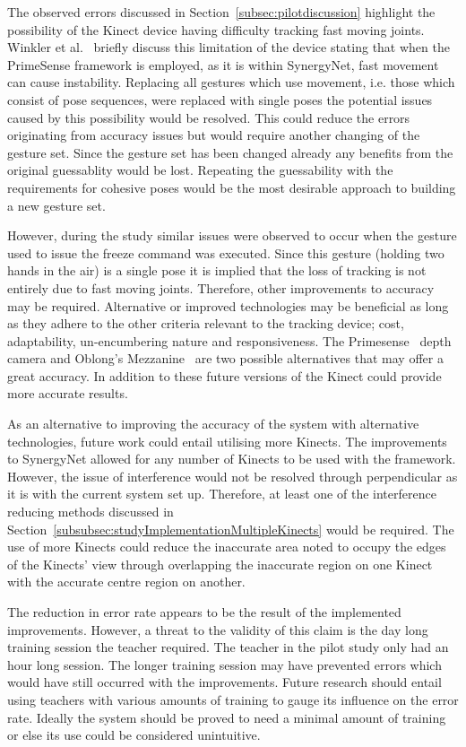 \documentclass[link]{IWCOMP}
\begin{document}
The observed errors discussed in Section~\ref{subsec:pilotdiscussion} highlight the possibility of the Kinect device having difficulty tracking fast moving joints.
Winkler et al.~\cite{Winkler2012} briefly discuss this limitation of the device stating that when the PrimeSense framework is employed, as it is within SynergyNet, fast movement can cause instability.
Replacing all gestures which use movement, i.e. those which consist of pose sequences, were replaced with single poses the potential issues caused by this possibility would be resolved.
This could reduce the errors originating from accuracy issues but would require another changing of the gesture set.
Since the gesture set has been changed already any benefits from the original guessablity would be lost.
Repeating the guessability with the requirements for cohesive poses would be the most desirable approach to building a new gesture set.

However, during the study similar issues were observed to occur when the gesture used to issue the freeze command was executed.
Since this gesture (holding two hands in the air) is a single pose it is implied that the loss of tracking is not entirely due to fast moving joints.
Therefore, other improvements to accuracy may be required.
Alternative or improved technologies may be beneficial as long as they adhere to the other criteria relevant to the tracking device; cost, adaptability, un-encumbering nature and responsiveness.
The Primesense~\cite{Wilson2010} depth camera and Oblong's Mezzanine~\cite{kramer2011} are two possible alternatives that may offer a great accuracy.
In addition to these future versions of the Kinect could provide more accurate results.

As an alternative to improving the accuracy of the system with alternative technologies, future work could entail utilising more Kinects.
The improvements to SynergyNet allowed for any number of Kinects to be used with the framework.
However, the issue of interference would not be resolved through perpendicular as it is with the current system set up.
Therefore, at least one of the interference reducing methods discussed in Section~\ref{subsubsec:studyImplementationMultipleKinects} would be required.
The use of more Kinects could reduce the inaccurate area noted to occupy the edges of the Kinects' view through overlapping the inaccurate region on one Kinect with the accurate centre region on another.

The reduction in error rate appears to be the result of the implemented improvements.
However, a threat to the validity of this claim is the day long training session the teacher required.
The teacher in the pilot study only had an hour long session.
The longer training session may have prevented errors which would have still occurred with the improvements.
Future research should entail using teachers with various amounts of training to gauge its influence on the error rate.
Ideally the system should be proved to need a minimal amount of training or else its use could be considered unintuitive.
\end{document}
